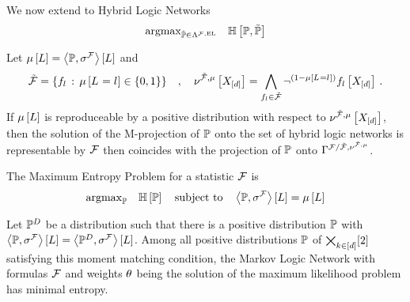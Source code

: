 We now extend to Hybrid Logic Networks
\begin{align*}
    \mathrm{argmax}_{\tilde{\mathbb{P}}\in\Lambda^{\mathcal{F},\mathrm{EL}}} \quad
    \mathbb{H}\left[\mathbb{P},\tilde{\mathbb{P}}\right]
\end{align*}



\begin{corollary}
    Let $\mu\left[L\right] = \left\langle \mathbb{P},\sigma^{\mathcal{F}}\right\rangle \left[ L \right]$ and
    \[ \tilde{\mathcal{F}} = \{f_{l} \, : \, \mu\left[L_{}=l_{}\right] \in \{0,1\}\} \quad , \quad
    \nu^{\tilde{\mathcal{F}},\mu}\left[X_{[d]}\right]
    = \bigwedge_{f_{l}\in\tilde{\mathcal{F}}} \lnot^{(1-\mu\left[L_{}=l_{}\right])} f_{l}\left[X_{[d]}\right]
    \, . \]
    If $\mu\left[L\right]$ is reproduceable by a positive distribution with respect to $\nu^{\tilde{\mathcal{F}},\mu}\left[X_{[d]}\right] $, then the solution of the M-projection of $\mathbb{P}$ onto the set of hybrid logic networks is representable by $\mathcal{F}$ then coincides with the projection of $\mathbb{P}$ onto $\Gamma^{\mathcal{F}/\tilde{\mathcal{F}},\nu^{\tilde{\mathcal{F}},\mu}}$.
\end{corollary}



The Maximum Entropy Problem for a statistic $\mathcal{F}$ is %
\begin{align}
    \mathrm{argmax}_{\mathbb{P}} \quad \mathbb{H}\left[\mathbb{P}\right]
    \quad \text{subject to} \quad
    \left\langle \mathbb{P},\sigma^{\mathcal{F}}\right\rangle \left[ L \right]
    =  \mu\left[L\right]
\end{align}



\begin{corollary}%
    Let $\mathbb{P}^{D}$ be a distribution such that there is a positive distribution $\mathbb{P}$ with $\left\langle \mathbb{P},\sigma^{\mathcal{F}}\right\rangle \left[ L \right] = \left\langle \mathbb{P}^{D},\sigma^{\mathcal{F}}\right\rangle \left[ L \right]$.
    Among all positive distributions $\mathbb{P}$ of $\bigtimes_{k\in[d]}[2]$ satisfying this moment matching condition, the Markov Logic Network with formulas $\mathcal{F}$ and weights $\theta$ being the solution of the maximum likelihood problem has minimal entropy.
\end{corollary}

